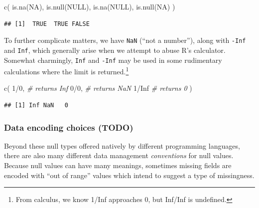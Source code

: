 \documentclass[
]{krantz}
\makeatletter
\newenvironment{Shaded}{\begin{snugshade}}{\end{snugshade}}
\newcommand{\CommentTok}[1]{\textcolor[rgb]{0.37,0.37,0.37}{\textit{#1}}}
\newcommand{\ConstantTok}[1]{\textcolor[rgb]{0,0,0}{#1}}
\newcommand{\DecValTok}[1]{\textcolor[rgb]{0.06,0.06,0.06}{#1}}
\newcommand{\FunctionTok}[1]{\textcolor[rgb]{0,0,0}{#1}}
\newcommand{\NormalTok}[1]{#1}
\newcommand{\SpecialCharTok}[1]{\textcolor[rgb]{0,0,0}{#1}}
\newenvironment{kframe}{%
\medskip{}
\setlength{\fboxsep}{.8em}
 \def\at@end@of@kframe{}%
 \ifinner\ifhmode%
  \def\at@end@of@kframe{\end{minipage}}%
  \begin{minipage}{\columnwidth}%
 \fi\fi%
 \def\FrameCommand##1{\hskip\@totalleftmargin \hskip-\fboxsep
 \colorbox{shadecolor}{##1}\hskip-\fboxsep
     \hskip-\linewidth \hskip-\@totalleftmargin \hskip\columnwidth}%
 \MakeFramed {\advance\hsize-\width
   \@totalleftmargin\z@ \linewidth\hsize
   \@setminipage}}%
 {\par\unskip\endMakeFramed%
 \at@end@of@kframe}
\renewenvironment{Shaded}{\begin{kframe}}{\end{kframe}}
\makeatother
\begin{document}
\begin{Shaded}
\begin{Highlighting}[]
\FunctionTok{c}\NormalTok{(}
  \FunctionTok{is.na}\NormalTok{(}\ConstantTok{NA}\NormalTok{),}
  \FunctionTok{is.null}\NormalTok{(}\ConstantTok{NULL}\NormalTok{),}
  \FunctionTok{is.na}\NormalTok{(}\ConstantTok{NULL}\NormalTok{),}
  \FunctionTok{is.null}\NormalTok{(}\ConstantTok{NA}\NormalTok{)}
\NormalTok{)}
\end{Highlighting}
\end{Shaded}

\begin{verbatim}
## [1]  TRUE  TRUE FALSE
\end{verbatim}

To further complicate matters, we have \texttt{NaN} (``not a number''), along with \texttt{-Inf} and \texttt{Inf}, which generally arise when we attempt to abuse R's calculator. Somewhat charmingly, \texttt{Inf} and \texttt{-Inf} may be used in some rudimentary calculations where the limit is returned.\footnote{From calculus, we know 1/Inf approaches 0, but Inf/Inf is undefined.}

\begin{Shaded}
\begin{Highlighting}[]
\FunctionTok{c}\NormalTok{(}
  \DecValTok{1}\SpecialCharTok{/}\DecValTok{0}\NormalTok{,   }\CommentTok{\# returns Inf}
  \DecValTok{0}\SpecialCharTok{/}\DecValTok{0}\NormalTok{,   }\CommentTok{\# returns NaN}
  \DecValTok{1}\SpecialCharTok{/}\ConstantTok{Inf}  \CommentTok{\# returns 0}
\NormalTok{)}
\end{Highlighting}
\end{Shaded}

\begin{verbatim}
## [1] Inf NaN   0
\end{verbatim}

\hypertarget{data-encoding-choices-todo}{%
\subsubsection{Data encoding choices (TODO)}\label{data-encoding-choices-todo}}

Beyond these null types offered natively by different programming languages, there are also many different data management \emph{conventions} for null values. Because null values can have many meanings, sometimes missing fields are encoded with ``out of range'' values which intend to suggest a type of missingness.
\end{document}
